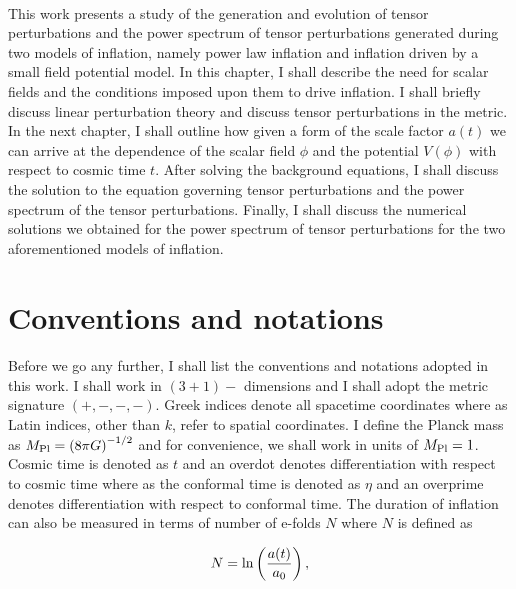 \documentclass[12pt,a4paper,oneside]{book}
\begin{document}
\paragraph*{} This work presents a study of the generation and evolution of tensor perturbations and the power 
spectrum of tensor perturbations generated during two models of inflation, namely power law inflation and inflation
driven by a small field potential model. In this chapter, I shall describe the 
need for scalar fields and the conditions imposed upon them to drive inflation. I shall briefly discuss linear perturbation 
theory and discuss tensor perturbations in the metric. In the next chapter, I shall outline how given a form of the scale 
factor $a(t)$ we can arrive at the dependence of the scalar field $\phi$ and the potential $V(\phi)$ with respect to 
cosmic time $t$. After solving the background equations, I shall discuss the solution to the equation governing tensor 
perturbations and the power spectrum of the tensor perturbations. Finally, I shall discuss the numerical solutions we 
obtained for the power spectrum of tensor perturbations for the two aforementioned models of inflation.

\section{Conventions and notations}

\paragraph*{} Before we go any further, I shall list the conventions and notations adopted in this work. I shall work in $(3+1)-$ dimensions
and I shall adopt the metric signature $(+,-,-,-)$. Greek indices denote all spacetime coordinates where as Latin indices, 
other than $k$, refer to spatial coordinates. I define the Planck mass as $M_{\rm Pl}=\left(8\pi G\right)^{-1/2}$ 
and for convenience, we shall work in units of $M_{\rm Pl} = 1$.
Cosmic time is denoted as $t$ and an overdot denotes differentiation with respect to cosmic time where as 
the conformal time is denoted as $\eta$ and an overprime denotes differentiation with respect to conformal time. 
The duration of inflation can also be measured in terms of number of e-folds $N$ where $N$ is defined as 

\begin{equation}
N = {\rm ln}\left(\frac{a(t)}{a_0}\right),
\end{equation}
\end{document}

